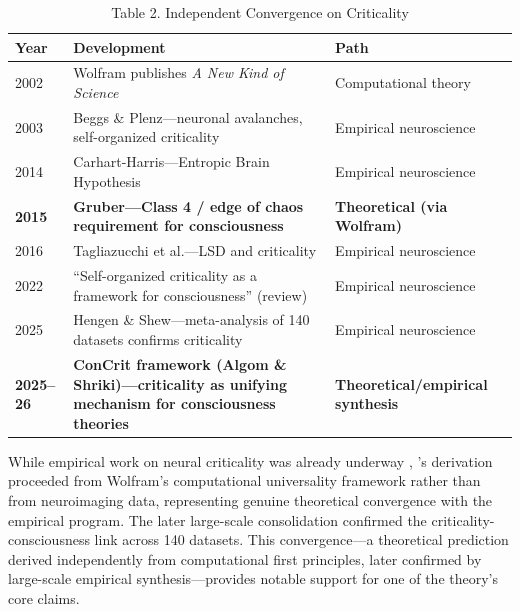 \documentclass[12pt]{article}
\begin{document}
\begin{table}[htbp]
\centering
\caption{Table 2. Independent Convergence on Criticality}
\label{tab:criticality-convergence}
\small
\renewcommand{\arraystretch}{1.4}
\begin{tabular}{>{\raggedright}p{1.5cm} X >{\raggedright\arraybackslash}p{3.5cm}}
\toprule
\textbf{Year} & \textbf{Development} & \textbf{Path} \\
\midrule
2002 & Wolfram publishes \emph{A New Kind of Science} & Computational theory \\
2003 & Beggs \& Plenz---neuronal avalanches, self-organized criticality & Empirical neuroscience \\
2014 & Carhart-Harris---Entropic Brain Hypothesis & Empirical neuroscience \\
\textbf{2015} & \textbf{Gruber---Class 4 / edge of chaos requirement for consciousness} & \textbf{Theoretical (via Wolfram)} \\
2016 & Tagliazucchi et al.---LSD and criticality & Empirical neuroscience \\
2022 & ``Self-organized criticality as a framework for consciousness'' (review) & Empirical neuroscience \\
2025 & Hengen \& Shew---meta-analysis of 140 datasets confirms criticality & Empirical neuroscience \\
\textbf{2025--26} & \textbf{ConCrit framework (Algom \& Shriki)---criticality as unifying mechanism for consciousness theories} & \textbf{Theoretical/empirical synthesis} \\
\bottomrule
\end{tabular}
\end{table}

While empirical work on neural criticality was already underway \citep{Beggs2003,Tagliazucchi2012}, \citeauthor{Gruber2015}'s \citeyearpar{Gruber2015} derivation proceeded from Wolfram's computational universality framework rather than from neuroimaging data, representing genuine theoretical convergence with the empirical program. The later large-scale consolidation \citep{HengenShew2025,AlgomShriki2026} confirmed the criticality-consciousness link across 140 datasets. This convergence---\hspace{0pt}a theoretical prediction derived independently from computational first principles, later confirmed by large-scale empirical synthesis---\hspace{0pt}provides notable support for one of the theory's core claims.
\end{document}
